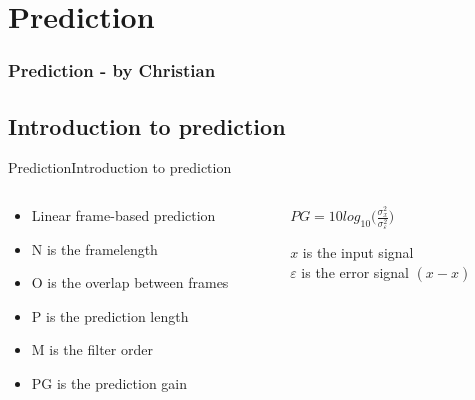 \section{Prediction}
\begin{frame}
	\frametitle{Prediction - by Christian}
	\tableofcontents[currentsection]
\end{frame}

\subsection{Introduction to prediction}
\begin{frame}{Prediction}{Introduction to prediction}
	\begin{columns}
		\begin{column}{0.5\textwidth}
			\begin{itemize}
				\item Linear frame-based prediction
				\item N is the framelength
				\item O is the overlap between frames
				\item P is the prediction length
				\item M is the filter order
				\item PG is the prediction gain
			\end{itemize}
		\end{column}
		\begin{column}{0.5\textwidth} 
			$PG = 10 log_{10}\bigg(\frac{\sigma^2_x}{\sigma^2_\varepsilon}\bigg)	$
			
			$x$ is the input signal\\
			$\varepsilon$ is the error signal $(x-\hat{x})$
		\end{column}
	\end{columns}
\end{frame}

